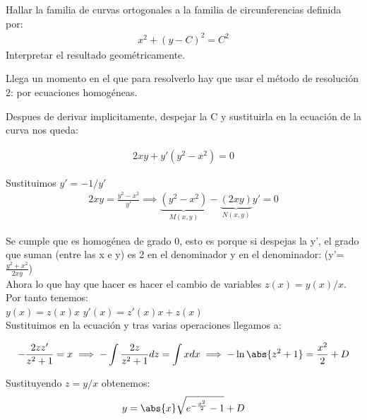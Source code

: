 \documentclass[nochap]{apuntes}
\begin{document}
\begin{problem}[10]
Hallar la familia de curvas ortogonales a la familia de circunferencias definida por:
\begin{gather*}
x^2+(y-C)^2=C^2
\end{gather*}
Interpretar el resultado geométricamente.

\solution

\begin{expla}
Llega un momento en el que para resolverlo hay que usar el método de resolución 2: por ecuaciones homogéneas.
\end{expla}

Despues de derivar implicitamente, despejar la C y sustituirla en la ecuación de la curva nos queda:

\begin{gather*}
2xy+y'(y^2-x^2)=0
\end{gather*}

Sustituimos $y'=-1/y'$
\begin{gather*}
2xy=\frac{y^2-x^2}{y'} \implies \underbrace{(y^2-x^2)}_{M(x,y)}-\underbrace{(2xy)}_{N(x,y)}y'=0 
\end{gather*}

Se cumple que es homogénea de grado 0, esto es porque si despejas la y', el grado que suman (entre las x e y) es 2 en el denominador y en el denominador: (y'=$\frac{y^2+x^2}{2xy}$) \\
Ahora lo que hay que hacer es hacer el cambio de variables $z(x)=y(x)/x$. Por tanto tenemos:\\
$y(x)=z(x)x$ \;\;\;\; $y'(x)=z'(x)x +z(x)$\\
Sustituimos en la ecuación y tras varias operaciones llegamos a:

\begin{gather*}
-\frac{2zz'}{z^2+1}=x \implies -\int \frac{2z}{z^2+1}dz=\int xdx \implies -\ln \abs{z^2+1}=\frac{x^2}{2}+D
\end{gather*}

Sustituyendo $z=y/x$ obtenemos:
\begin{gather*}
y=\abs{x}\sqrt{e^{-\frac{x^2}{2}}-1}+D
\end{gather*}

\end{problem}
\newpage
\end{document}
